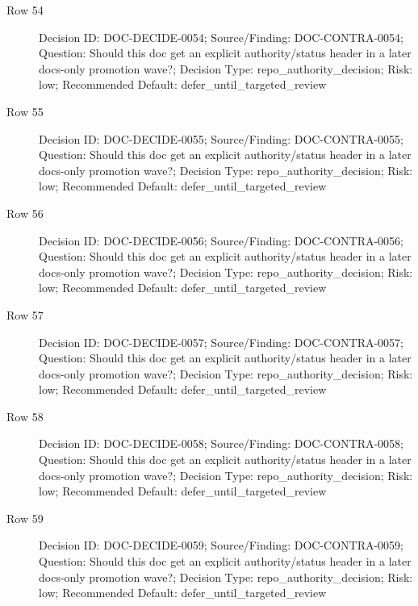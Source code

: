 \documentclass[9pt,a4paper,openany]{book}
\begin{document}
\begin{description}
\item[Row 54] Decision ID: DOC-\allowbreak{}DECIDE-\allowbreak{}0054; Source/\allowbreak{}Finding: DOC-\allowbreak{}CONTRA-\allowbreak{}0054; Question: Should this doc get an explicit authority/\allowbreak{}status header in a later docs-\allowbreak{}only promotion wave?; Decision Type: repo\_\allowbreak{}authority\_\allowbreak{}decision; Risk: low; Recommended Default: defer\_\allowbreak{}until\_\allowbreak{}targeted\_\allowbreak{}review
\item[Row 55] Decision ID: DOC-\allowbreak{}DECIDE-\allowbreak{}0055; Source/\allowbreak{}Finding: DOC-\allowbreak{}CONTRA-\allowbreak{}0055; Question: Should this doc get an explicit authority/\allowbreak{}status header in a later docs-\allowbreak{}only promotion wave?; Decision Type: repo\_\allowbreak{}authority\_\allowbreak{}decision; Risk: low; Recommended Default: defer\_\allowbreak{}until\_\allowbreak{}targeted\_\allowbreak{}review
\item[Row 56] Decision ID: DOC-\allowbreak{}DECIDE-\allowbreak{}0056; Source/\allowbreak{}Finding: DOC-\allowbreak{}CONTRA-\allowbreak{}0056; Question: Should this doc get an explicit authority/\allowbreak{}status header in a later docs-\allowbreak{}only promotion wave?; Decision Type: repo\_\allowbreak{}authority\_\allowbreak{}decision; Risk: low; Recommended Default: defer\_\allowbreak{}until\_\allowbreak{}targeted\_\allowbreak{}review
\item[Row 57] Decision ID: DOC-\allowbreak{}DECIDE-\allowbreak{}0057; Source/\allowbreak{}Finding: DOC-\allowbreak{}CONTRA-\allowbreak{}0057; Question: Should this doc get an explicit authority/\allowbreak{}status header in a later docs-\allowbreak{}only promotion wave?; Decision Type: repo\_\allowbreak{}authority\_\allowbreak{}decision; Risk: low; Recommended Default: defer\_\allowbreak{}until\_\allowbreak{}targeted\_\allowbreak{}review
\item[Row 58] Decision ID: DOC-\allowbreak{}DECIDE-\allowbreak{}0058; Source/\allowbreak{}Finding: DOC-\allowbreak{}CONTRA-\allowbreak{}0058; Question: Should this doc get an explicit authority/\allowbreak{}status header in a later docs-\allowbreak{}only promotion wave?; Decision Type: repo\_\allowbreak{}authority\_\allowbreak{}decision; Risk: low; Recommended Default: defer\_\allowbreak{}until\_\allowbreak{}targeted\_\allowbreak{}review
\item[Row 59] Decision ID: DOC-\allowbreak{}DECIDE-\allowbreak{}0059; Source/\allowbreak{}Finding: DOC-\allowbreak{}CONTRA-\allowbreak{}0059; Question: Should this doc get an explicit authority/\allowbreak{}status header in a later docs-\allowbreak{}only promotion wave?; Decision Type: repo\_\allowbreak{}authority\_\allowbreak{}decision; Risk: low; Recommended Default: defer\_\allowbreak{}until\_\allowbreak{}targeted\_\allowbreak{}review

\end{description}
\end{document}
